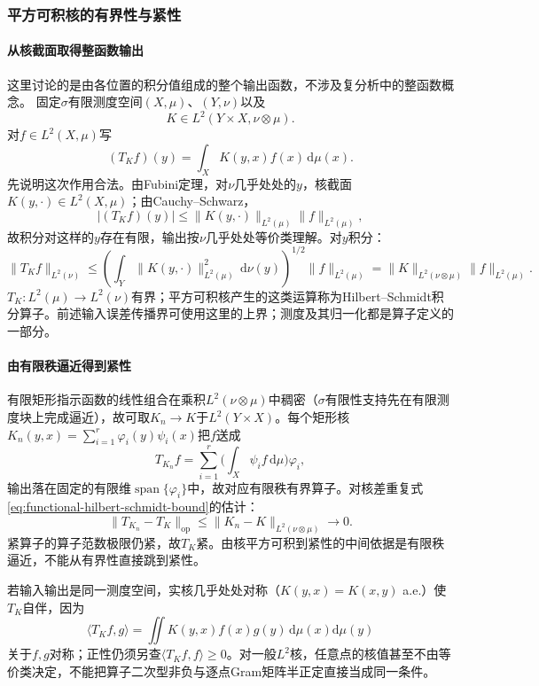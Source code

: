 \subsubsection{平方可积核的有界性与紧性}
\label{subsubsec:hilbert-schmidt}

\paragraph{从核截面取得整函数输出}

这里讨论的是由各位置的积分值组成的整个输出函数，不涉及复分析中的整函数概念。
固定$\sigma$有限测度空间$(X,\mu)$、$(Y,\nu)$以及
\[
K\in L^2(Y\times X,\nu\otimes\mu).
\]
对$f\in L^2(X,\mu)$写
\begin{equation}
\label{eq:functional-kernel-integral-operator}
(T_Kf)(y)=\int_X K(y,x)f(x)\,\mathrm d\mu(x).
\end{equation}
先说明这次作用合法。由Fubini定理，对$\nu$几乎处处的$y$，核截面$K(y,\cdot)\in L^2(X,\mu)$；由Cauchy–Schwarz，
\[
|(T_Kf)(y)|\le\|K(y,\cdot)\|_{L^2(\mu)}\|f\|_{L^2(\mu)},
\]
故积分对这样的$y$存在有限，输出按$\nu$几乎处处等价类理解。对$y$积分：
\begin{equation}
\label{eq:functional-hilbert-schmidt-bound}
\|T_Kf\|_{L^2(\nu)}
\le\left(\int_Y\|K(y,\cdot)\|_{L^2(\mu)}^2\,\mathrm d\nu(y)\right)^{1/2}\|f\|_{L^2(\mu)}
=\|K\|_{L^2(\nu\otimes\mu)}\|f\|_{L^2(\mu)}.
\end{equation}
$T_K:L^2(\mu)\to L^2(\nu)$有界；平方可积核产生的这类运算称为Hilbert–Schmidt积分算子。前述输入误差传播界可使用这里的上界；测度及其归一化都是算子定义的一部分。

\paragraph{由有限秩逼近得到紧性}

有限矩形指示函数的线性组合在乘积$L^2(\nu\otimes\mu)$中稠密（$\sigma$有限性支持先在有限测度块上完成逼近），故可取$K_n\to K$于$L^2(Y\times X)$。每个矩形核$K_n(y,x)=\sum_{i=1}^r\varphi_i(y)\psi_i(x)$把$f$送成
\[
T_{K_n}f=\sum_{i=1}^r\Big(\int_X\psi_i f\,\mathrm d\mu\Big)\varphi_i,
\]
输出落在固定的有限维$\operatorname{span}\{\varphi_i\}$中，故对应有限秩有界算子。对核差重复式\eqref{eq:functional-hilbert-schmidt-bound}的估计：
\[
\|T_{K_n}-T_K\|_{\mathrm{op}}\le\|K_n-K\|_{L^2(\nu\otimes\mu)}\to0.
\]
紧算子的算子范数极限仍紧，故$T_K$紧。由核平方可积到紧性的中间依据是有限秩逼近，不能从有界性直接跳到紧性。

若输入输出是同一测度空间，实核几乎处处对称（$K(y,x)=K(x,y)$ a.e.）使$T_K$自伴，因为
\[
\langle T_Kf,g\rangle=\iint K(y,x)f(x)g(y)\,\mathrm d\mu(x)\mathrm d\mu(y)
\]
关于$f,g$对称；正性仍须另查$\langle T_Kf,f\rangle\ge0$。对一般$L^2$核，任意点的核值甚至不由等价类决定，不能把算子二次型非负与逐点Gram矩阵半正定直接当成同一条件。

